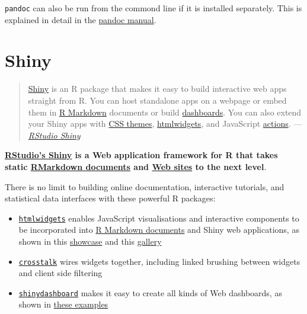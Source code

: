 \documentclass[]{book}
\theoremstyle{definition}
\theoremstyle{definition}
\theoremstyle{definition}
\theoremstyle{remark}
\begin{document}
\texttt{pandoc} can also be run from the commond line if it is installed
separately. This is explained in detail in the
\href{http://pandoc.org/MANUAL.html}{pandoc manual}.

\hypertarget{shiny}{%
\section{Shiny}\label{shiny}}

\begin{quote}
\href{http://shiny.rstudio.com/}{Shiny} is an R package that makes it
easy to build interactive web apps straight from R. You can host
standalone apps on a webpage or embed them in
\href{http://rmarkdown.rstudio.com/}{R Markdown} documents or build
\href{http://rstudio.github.io/shinydashboard/}{dashboards}. You can
also extend your Shiny apps with
\href{http://rstudio.github.io/shinythemes/}{CSS themes},
\href{http://www.htmlwidgets.org/}{htmlwidgets}, and JavaScript
\href{https://github.com/daattali/shinyjs/blob/master/README.md}{actions}.
--- \href{http://shiny.rstudio.com/}{\emph{RStudio Shiny}}
\end{quote}

\textbf{\href{http://shiny.rstudio.com/}{RStudio's Shiny} is a Web
application framework for R that takes static
\protect\hyperlink{rmarkdown}{RMarkdown documents} and
\href{https://rmarkdown.rstudio.com/html_document_format.html}{Web
sites} to the next level}.

There is no limit to building online documentation, interactive
tutorials, and statistical data interfaces with these powerful R
packages:

\begin{itemize}
\item
  \href{http://www.htmlwidgets.org/}{\texttt{htmlwidgets}} enables
  JavaScript visualisations and interactive components to be
  incorporated into \protect\hyperlink{rmarkdown}{R Markdown documents}
  and Shiny web applications, as shown in this
  \href{http://www.htmlwidgets.org/showcase_leaflet.html}{showcase} and
  this \href{http://www.htmlwidgets.org/}{gallery}
\item
  \href{http://rstudio.github.io/crosstalk/}{\texttt{crosstalk}} wires
  widgets together, including linked brushing between widgets and client
  side filtering
\item
  \href{http://rstudio.github.io/shinydashboard/}{\texttt{shinydashboard}}
  makes it easy to create all kinds of Web dashboards, as shown in
  \href{http://rstudio.github.io/shinydashboard/examples.html}{these
  examples}
\end{itemize}
\end{document}

